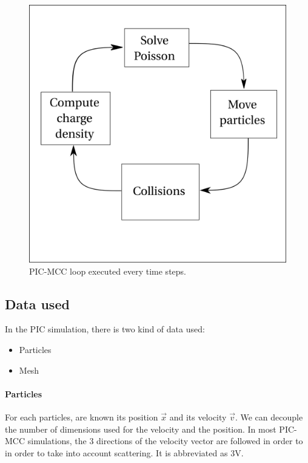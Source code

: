   \begin{figure}[hbtp]
    \centering
    \includegraphics{picloop.png}
    \caption{\ac{PIC}-\ac{MCC} loop executed every time steps.}
    \label{fig-picloop}
  \end{figure}

  \subsection{Data used}
    In the \ac{PIC} simulation, there is two kind of data used:
    \begin{itemize}
      \item Particles
      \item Mesh
    \end{itemize}

    \paragraph{Particles}
    For each particles, are known its position $\vec{x}$ and its velocity $\vec{v}$.
    We can decouple the number of dimensions used for the velocity and the position.
    In most \ac{PIC}-\ac{MCC} simulations, the 3 directions of the velocity vector are followed in order to in order to take into account scattering.
    It is abbreviated as \acs{3V}.

